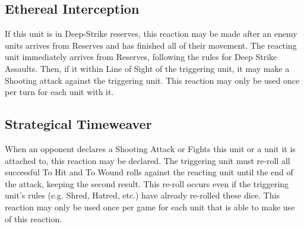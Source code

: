 \subsection{Ethereal Interception} \label{Ethereal Interception}

If this unit is in Deep-Strike reserves, this reaction may be made after an enemy units arrives from Reserves and has finished all of their movement. The reacting unit immediately arrives from Reserves, following the rules for Deep Strike Assaults. Then, if it within Line of Sight of the triggering unit, it may make a Shooting attack against the triggering unit. This reaction may only be used once per turn for each unit with it. \\

\subsection{Strategical Timeweaver} \label{Strategical Timeweaver}

When an opponent declares a Shooting Attack or Fights this unit or a unit it is attached to, this reaction may be declared. The triggering unit must re-roll all successful To Hit and To Wound rolls against the reacting unit until the end of the attack, keeping the second result. This re-roll occurs even if the triggering unit's rules (e.g. Shred, Hatred, etc.) have already re-rolled these dice. This reaction may only be used once per game for each unit that is able to make use of this reaction.

